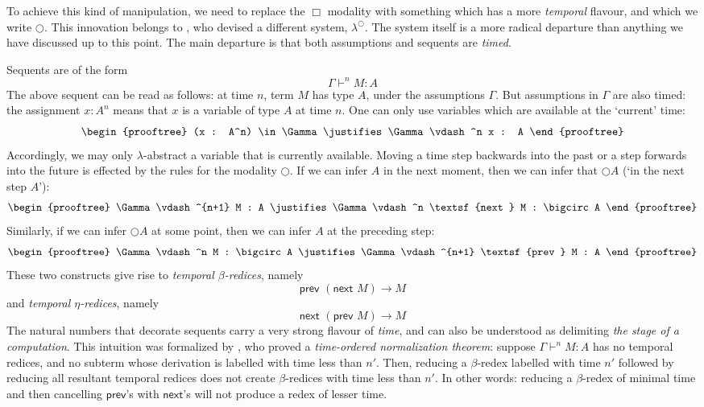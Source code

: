 \documentclass[a4paper]{amsart}
\begin{document}
To achieve this kind of manipulation, we need to replace the
$\Box$ modality with something which has a more \emph{temporal}
flavour, and which we write $\bigcirc$. This innovation belongs to
\cite{Davies1995, Davies1996a}, who devised a different system,
$\lambda^\bigcirc$. The system itself is a more radical departure
than anything we have discussed up to this point. The main
departure is that both assumptions and sequents are \emph{timed}.

Sequents are of the form \[ \Gamma \vdash^n M : A \] The above
sequent can be read as follows: at time $n$, term $M$
has type $A$, under the assumptions $\Gamma$. But assumptions in
$\Gamma$ are also timed: the assignment $x : A^n$ means that $x$
is a variable of type $A$ at time $n$. One can only use variables
which are available at the `current' time: \[
  \begin{prooftree}
    (x : A^n) \in \Gamma
      \justifies
    \Gamma \vdash^n x : A
  \end{prooftree}
\] Accordingly, we may only $\lambda$-abstract a variable that is
currently available. Moving a time step backwards into the past or
a step forwards into the future is effected by the rules for the
modality $\bigcirc$. If we can infer $A$ in the next moment, then
we can infer that $\bigcirc A$ (`in the next step $A$'): \[
  \begin{prooftree}
    \Gamma \vdash^{n+1} M : A
      \justifies
    \Gamma \vdash^n \textsf{next } M : \bigcirc A
  \end{prooftree}
\] Similarly, if we can infer $\bigcirc A$ at some point, then we can infer
$A$ at the preceding step: \[
  \begin{prooftree}
    \Gamma \vdash^n M : \bigcirc A
      \justifies
    \Gamma \vdash^{n+1} \textsf{prev } M : A
  \end{prooftree}
\] These two constructs give rise to \emph{temporal $\beta$-redices},
namely \[
  \textsf{prev } (\textsf{next } M) \rightarrow M
\] and \emph{temporal $\eta$-redices}, namely \[
  \textsf{next } (\textsf{prev } M) \rightarrow M
\] The natural numbers that decorate sequents carry a very strong
flavour of \emph{time}, and can also be understood as delimiting
\emph{the stage of a computation}. This intuition was formalized
by \cite{Davies1996a}, who proved a \emph{time-ordered
normalization theorem}: suppose $\Gamma \vdash^n M : A$ has no
temporal redices, and no subterm whose derivation is labelled with
time less than $n'$. Then, reducing a $\beta$-redex labelled with
time $n'$ followed by reducing all resultant temporal redices does
not create $\beta$-redices with time less than $n'$. In other
words: reducing a $\beta$-redex of minimal time and then
cancelling $\textsf{prev}$'s with $\textsf{next}$'s will not
produce a redex of lesser time.
\end{document}
